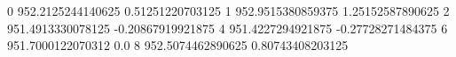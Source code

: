 0 952.2125244140625 0.51251220703125
1 952.9515380859375 1.25152587890625
2 951.4913330078125 -0.20867919921875
4 951.4227294921875 -0.27728271484375
6 951.7000122070312 0.0
8 952.5074462890625 0.80743408203125
